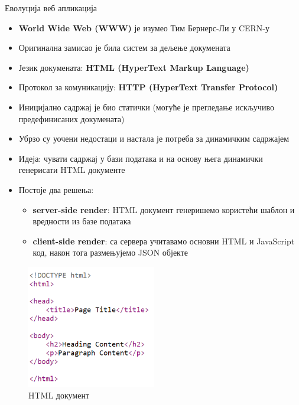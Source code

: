 \documentclass{beamer}
\begin{document}
    \begin{frame}[allowframebreaks]{Еволуција веб апликација}
        \begin{itemize}
            \item \textbf{World Wide Web (WWW)} је изумео Тим Бернерс-Ли у CERN-у
            \item Оригинална замисао је била систем за дељење докумената
            \item Језик докумената: \textbf{HTML (HyperText Markup Language)}
            \item Протокол за комуникацију: \textbf{HTTP (HyperText Transfer Protocol)}
            \item Иницијално садржај је био статички (могуће је прегледање искључиво предефинисаних докумената)
            \item Убрзо су уочени недостаци и настала је потреба за динамичким садржајем
        \end{itemize}
        
        \framebreak
        
        \begin{itemize}
            \item Идеја: чувати садржај у бази података и на основу њега динамички генерисати HTML документе
            \item Постоје два решења:
            \begin{itemize}
                \item \textbf{server-side render}: HTML документ генеришемо користећи шаблон и вредности из базе података
                \item \textbf{client-side render}: са сервера учитавамо основни HTML и JavaScript код, након тога размењујемо JSON објекте
            \end{itemize}
        \end{itemize}
        
        \framebreak
        
        \begin{figure}
            \centering
            \includegraphics[width=0.5\textwidth]{images/html.png}
            \caption{HTML документ}
            \label{fig:html}
        \end{figure}
        

\end{frame}
\end{document}
